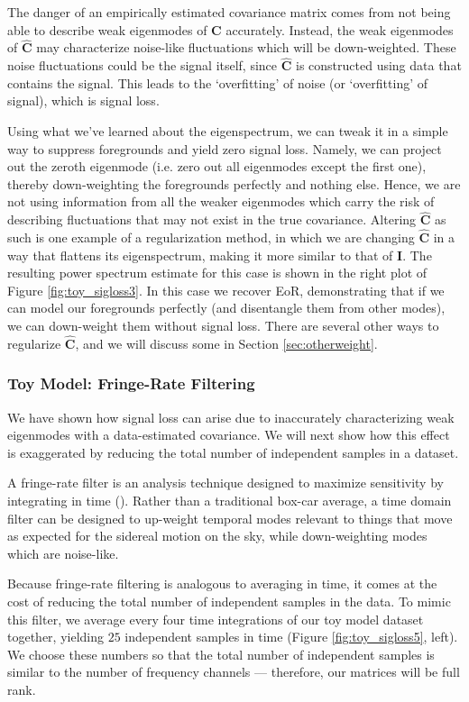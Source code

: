 \documentclass[preprint2,numberedappendix,tighten]{aastex6}  %
\begin{document}
The danger of an empirically estimated covariance matrix comes from not being able to describe weak eigenmodes of $\textbf{C}$ accurately. Instead, the weak eigenmodes of $\hat{\textbf{C}}$ may characterize noise-like fluctuations which will be down-weighted. These noise fluctuations could be the signal itself, since $\hat{\textbf{C}}$ is constructed using data that contains the signal. This leads to the `overfitting' of noise (or `overfitting' of signal), which is signal loss. 

Using what we've learned about the eigenspectrum, we can tweak it in a simple way to suppress foregrounds and yield zero signal loss. Namely, we can project out the zeroth eigenmode (i.e. zero out all eigenmodes except the first one), thereby down-weighting the foregrounds perfectly and nothing else. Hence, we are not using information from all the weaker eigenmodes which carry the risk of describing fluctuations that may not exist in the true covariance. Altering $\hat{\textbf{C}}$ as such is one example of a regularization method, in which we are changing $\hat{\textbf{C}}$ in a way that flattens its eigenspectrum, making it more similar to that of $\textbf{I}$. The resulting power spectrum estimate for this case is shown in the right plot of Figure \ref{fig:toy_sigloss3}. In this case we recover EoR, demonstrating that if we can model our foregrounds perfectly (and disentangle them from other modes), we can down-weight them without signal loss. There are several other ways to regularize $\hat{\textbf{C}}$, and we will discuss some in Section \ref{sec:otherweight}.

\subsubsection{Toy Model: Fringe-Rate Filtering}

We have shown how signal loss can arise due to inaccurately characterizing weak eigenmodes with a data-estimated covariance. We will next show how this effect is exaggerated by reducing the total number of independent samples in a dataset. 

A fringe-rate filter is an analysis technique designed to maximize sensitivity by integrating in time (\citealt{parsons_et_al2016}). Rather than a traditional box-car average, a time domain filter can be designed to up-weight temporal modes relevant to things that move as expected for the sidereal motion on the sky, while down-weighting modes which are noise-like. 

Because fringe-rate filtering is analogous to averaging in time, it comes at the cost of reducing the total number of independent samples in the data. To mimic this filter, we average every four time integrations of our toy model dataset together, yielding $25$ independent samples in time (Figure \ref{fig:toy_sigloss5}, left). We choose these numbers so that the total number of independent samples is similar to the number of frequency channels --- therefore, our matrices will be full rank. 
\end{document}
